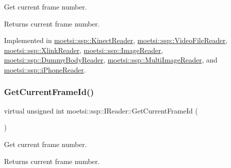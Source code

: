 Get current frame number. 

\begin{DoxyReturn}{Returns}
current frame number. 
\end{DoxyReturn}


Implemented in \hyperlink{classmoetsi_1_1ssp_1_1KinectReader_aa17e268723c41bdad5082575decb28eb}{moetsi\+::ssp\+::\+Kinect\+Reader}, \hyperlink{classmoetsi_1_1ssp_1_1VideoFileReader_aef5c92da2645cddc7e4ffcfd34ad4b8a}{moetsi\+::ssp\+::\+Video\+File\+Reader}, \hyperlink{classmoetsi_1_1ssp_1_1XlinkReader_ae11a3b07f2f036f87bc3d96685f61dae}{moetsi\+::ssp\+::\+Xlink\+Reader}, \hyperlink{classmoetsi_1_1ssp_1_1ImageReader_a386125736df9f25e5c4312bb679ff031}{moetsi\+::ssp\+::\+Image\+Reader}, \hyperlink{classmoetsi_1_1ssp_1_1DummyBodyReader_a91d5b81c241103ffde276d354a34d7db}{moetsi\+::ssp\+::\+Dummy\+Body\+Reader}, \hyperlink{classmoetsi_1_1ssp_1_1MultiImageReader_a994eea20e9682c2f4afc9303a34c76f3}{moetsi\+::ssp\+::\+Multi\+Image\+Reader}, and \hyperlink{classmoetsi_1_1ssp_1_1iPhoneReader_a78792c6319743aed3ef2afc96fe16485}{moetsi\+::ssp\+::i\+Phone\+Reader}.

\mbox{\label{classmoetsi_1_1ssp_1_1IReader_ac292d83eb06dee277baaa06e281a562d}} 
\subsubsection{\texorpdfstring{Get\+Current\+Frame\+Id()}{GetCurrentFrameId()}\hspace{0.1cm}{\footnotesize\ttfamily [2/2]}}
{\footnotesize\ttfamily virtual unsigned int moetsi\+::ssp\+::\+I\+Reader\+::\+Get\+Current\+Frame\+Id (\begin{DoxyParamCaption}{ }\end{DoxyParamCaption})\hspace{0.3cm}{\ttfamily [pure virtual]}}



Get current frame number. 

\begin{DoxyReturn}{Returns}
current frame number. 
\end{DoxyReturn}


